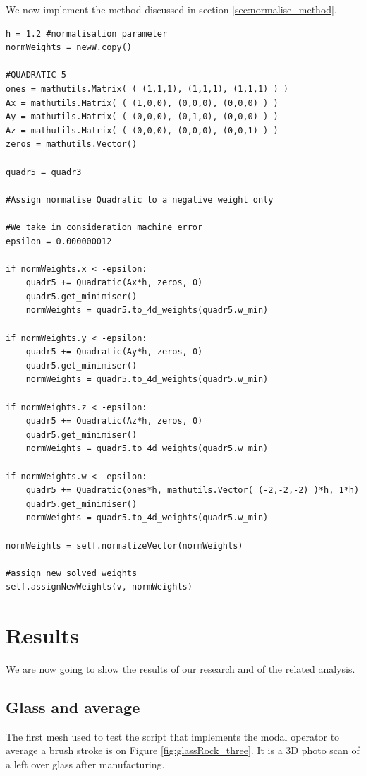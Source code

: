 \documentclass[12pt,twoside]{report}
\begin{document}
We now implement the method discussed in section \ref{sec:normalise_method}.

\begin{lstlisting}
h = 1.2 #normalisation parameter
normWeights = newW.copy()

#QUADRATIC 5
ones = mathutils.Matrix( ( (1,1,1), (1,1,1), (1,1,1) ) )
Ax = mathutils.Matrix( ( (1,0,0), (0,0,0), (0,0,0) ) )
Ay = mathutils.Matrix( ( (0,0,0), (0,1,0), (0,0,0) ) )           
Az = mathutils.Matrix( ( (0,0,0), (0,0,0), (0,0,1) ) )
zeros = mathutils.Vector()

quadr5 = quadr3

#Assign normalise Quadratic to a negative weight only

#We take in consideration machine error
epsilon = 0.000000012

if normWeights.x < -epsilon:
    quadr5 += Quadratic(Ax*h, zeros, 0)
    quadr5.get_minimiser()
    normWeights = quadr5.to_4d_weights(quadr5.w_min)

if normWeights.y < -epsilon:
    quadr5 += Quadratic(Ay*h, zeros, 0)
    quadr5.get_minimiser()
    normWeights = quadr5.to_4d_weights(quadr5.w_min)

if normWeights.z < -epsilon:
    quadr5 += Quadratic(Az*h, zeros, 0)
    quadr5.get_minimiser()
    normWeights = quadr5.to_4d_weights(quadr5.w_min)

if normWeights.w < -epsilon:
    quadr5 += Quadratic(ones*h, mathutils.Vector( (-2,-2,-2) )*h, 1*h)
    quadr5.get_minimiser()
    normWeights = quadr5.to_4d_weights(quadr5.w_min)

normWeights = self.normalizeVector(normWeights)

#assign new solved weights
self.assignNewWeights(v, normWeights)
\end{lstlisting}

\chapter{Results}
\label{ch:results}

We are now going to show the results of our research and of the related analysis.

\section{Glass and average}
\label{sec:glassPlaceholderaverage}
The first mesh used to test the script that implements the modal operator to average a brush stroke is on Figure \ref{fig:glassRock_three}. It is a 3D photo scan of a left over glass after manufacturing.
\end{document}
